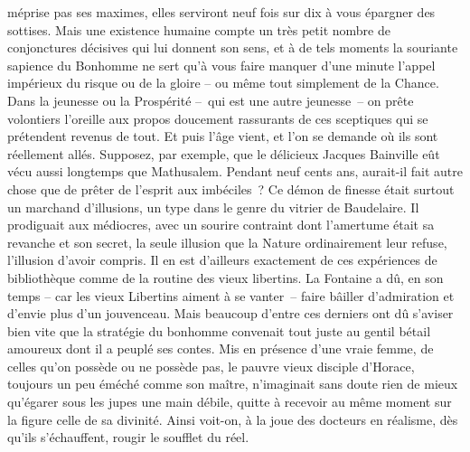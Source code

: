 \documentclass[french,twoside]{book} %
\newcommand{\astertri}{\medskip\par\centerline{\color{rubric}\large\selectfont{\syms ✻\,✻\,✻}}\medskip\par}%
\begin{document}
méprise pas ses maximes, elles serviront neuf fois sur dix à vous épargner des sottises. Mais une existence humaine compte un très petit nombre de conjonctures décisives qui lui donnent son sens, et à de tels moments la souriante sapience du Bonhomme ne sert qu’à vous faire manquer d’une minute l’appel impérieux du risque ou de la gloire – ou même tout simplement de la Chance. Dans la jeunesse ou la Prospérité – qui est une autre jeunesse – on prête volontiers l’oreille aux propos doucement rassurants de ces sceptiques qui se prétendent revenus de tout. Et puis l’âge vient, et l’on se demande où ils sont réellement allés. Supposez, par exemple, que le délicieux Jacques Bainville eût vécu aussi longtemps que Mathusalem. Pendant neuf cents ans, aurait-il fait autre chose que de prêter de l’esprit aux imbéciles ? Ce démon de finesse était surtout un marchand d’illusions, un type dans le genre du vitrier de Baudelaire. Il prodiguait aux médiocres, avec un sourire contraint dont l’amertume était sa revanche et son secret, la seule illusion que la Nature ordinairement leur refuse, l’illusion d’avoir compris. Il en est d’ailleurs exactement de ces expériences de bibliothèque comme de la routine des vieux libertins. La Fontaine a dû, en son temps – car les vieux Libertins aiment à se vanter – faire bâiller d’admiration et d’envie plus d’un jouvenceau. Mais beaucoup d’entre ces derniers ont dû s’aviser bien vite que la stratégie du bonhomme convenait tout juste au gentil bétail amoureux dont il a peuplé ses contes. Mis en présence d’une vraie femme, de celles qu’on possède ou ne possède pas, le pauvre vieux disciple d’Horace, toujours un peu éméché comme son maître, n’imaginait sans doute rien de mieux qu’égarer sous les jupes une main débile, quitte à recevoir au même moment sur la figure celle de sa divinité. Ainsi voit-on, à la joue des docteurs en réalisme, dès qu’ils s’échauffent, rougir le soufflet du réel.\par
 \par

\astertri
\end{document}
